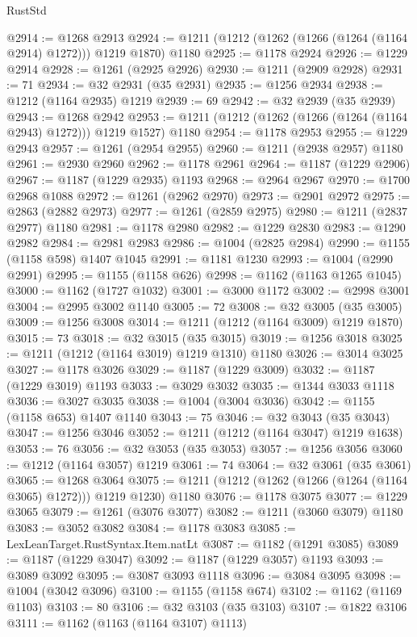 \begin{lexlean}{RustStd}
\begin{coremodule}
@2914 := @1268 @2913
@2924 := @1211 (@1212 (@1262 (@1266 (@1264 (@1164 @2914) @1272))) @1219 @1870) @1180
@2925 := @1178 @2924
@2926 := @1229 @2914
@2928 := @1261 (@2925 @2926)
@2930 := @1211 (@2909 @2928)
@2931 := 71
@2934 := @32 @2931 (@35 @2931)
@2935 := @1256 @2934
@2938 := @1212 (@1164 @2935) @1219
@2939 := 69
@2942 := @32 @2939 (@35 @2939)
@2943 := @1268 @2942
@2953 := @1211 (@1212 (@1262 (@1266 (@1264 (@1164 @2943) @1272))) @1219 @1527) @1180
@2954 := @1178 @2953
@2955 := @1229 @2943
@2957 := @1261 (@2954 @2955)
@2960 := @1211 (@2938 @2957) @1180
@2961 := @2930 @2960
@2962 := @1178 @2961
@2964 := @1187 (@1229 @2906)
@2967 := @1187 (@1229 @2935) @1193
@2968 := @2964 @2967
@2970 := @1700 @2968 @1088
@2972 := @1261 (@2962 @2970)
@2973 := @2901 @2972
@2975 := @2863 (@2882 @2973)
@2977 := @1261 (@2859 @2975)
@2980 := @1211 (@2837 @2977) @1180
@2981 := @1178 @2980
@2982 := @1229 @2830
@2983 := @1290 @2982
@2984 := @2981 @2983
@2986 := @1004 (@2825 @2984)
@2990 := @1155 (@1158 @598) @1407 @1045
@2991 := @1181 @1230
@2993 := @1004 (@2990 @2991)
@2995 := @1155 (@1158 @626)
@2998 := @1162 (@1163 @1265 @1045)
@3000 := @1162 (@1727 @1032)
@3001 := @3000 @1172
@3002 := @2998 @3001
@3004 := @2995 @3002 @1140
@3005 := 72
@3008 := @32 @3005 (@35 @3005)
@3009 := @1256 @3008
@3014 := @1211 (@1212 (@1164 @3009) @1219 @1870)
@3015 := 73
@3018 := @32 @3015 (@35 @3015)
@3019 := @1256 @3018
@3025 := @1211 (@1212 (@1164 @3019) @1219 @1310) @1180
@3026 := @3014 @3025
@3027 := @1178 @3026
@3029 := @1187 (@1229 @3009)
@3032 := @1187 (@1229 @3019) @1193
@3033 := @3029 @3032
@3035 := @1344 @3033 @1118
@3036 := @3027 @3035
@3038 := @1004 (@3004 @3036)
@3042 := @1155 (@1158 @653) @1407 @1140
@3043 := 75
@3046 := @32 @3043 (@35 @3043)
@3047 := @1256 @3046
@3052 := @1211 (@1212 (@1164 @3047) @1219 @1638)
@3053 := 76
@3056 := @32 @3053 (@35 @3053)
@3057 := @1256 @3056
@3060 := @1212 (@1164 @3057) @1219
@3061 := 74
@3064 := @32 @3061 (@35 @3061)
@3065 := @1268 @3064
@3075 := @1211 (@1212 (@1262 (@1266 (@1264 (@1164 @3065) @1272))) @1219 @1230) @1180
@3076 := @1178 @3075
@3077 := @1229 @3065
@3079 := @1261 (@3076 @3077)
@3082 := @1211 (@3060 @3079) @1180
@3083 := @3052 @3082
@3084 := @1178 @3083
@3085 := LexLeanTarget.RustSyntax.Item.natLt
@3087 := @1182 (@1291 @3085)
@3089 := @1187 (@1229 @3047)
@3092 := @1187 (@1229 @3057) @1193
@3093 := @3089 @3092
@3095 := @3087 @3093 @1118
@3096 := @3084 @3095
@3098 := @1004 (@3042 @3096)
@3100 := @1155 (@1158 @674)
@3102 := @1162 (@1169 @1103)
@3103 := 80
@3106 := @32 @3103 (@35 @3103)
@3107 := @1822 @3106
@3111 := @1162 (@1163 (@1164 @3107) @1113)

\end{coremodule}
\end{lexlean}
